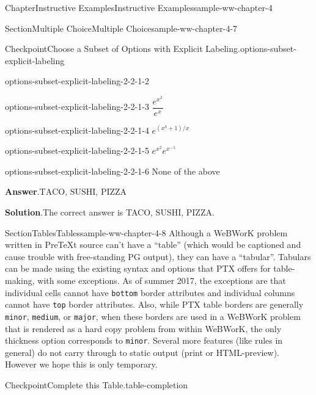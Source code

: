 \documentclass[oneside,10pt,]{book}
\newcommand{\blocktitlefont}{\relax}
\newcommand{\mono}[1]{\texttt{#1}}
\numberwithin{equation}{section}
\begin{document}
\begin{chapterptx}{Chapter}{Instructive Examples}{}{Instructive Examples}{}{}{sample-ww-chapter-4}
\begin{sectionptx}{Section}{Multiple Choice}{}{Multiple Choice}{}{}{sample-ww-chapter-4-7}
\begin{inlineexercise}{Checkpoint}{Choose a Subset of Options with Explicit Labeling.}{options-subset-explicit-labeling}
\begin{descriptionlist}
\begin{dlinarrow}{}{options-subset-explicit-labeling-2-2-1-2}
\end{dlinarrow}%
\begin{dlinarrow}{}{options-subset-explicit-labeling-2-2-1-3}%
\(\displaystyle \dfrac{ e^{x^2} }{ e^x }\)%
\end{dlinarrow}%
\begin{dlinarrow}{}{options-subset-explicit-labeling-2-2-1-4}%
\(\displaystyle e^{ (x^3+1) / x}\)%
\end{dlinarrow}%
\begin{dlinarrow}{}{options-subset-explicit-labeling-2-2-1-5}%
\(\displaystyle e^{x^2} e^{x^{-1}}\)%
\end{dlinarrow}%
\begin{dlinarrow}{}{options-subset-explicit-labeling-2-2-1-6}%
None of the above%
\end{dlinarrow}%
\end{descriptionlist}
%
\par\smallskip%
\noindent\textbf{\blocktitlefont Answer}.\hypertarget{options-subset-explicit-labeling-3}{}\quad{}\(\text{TACO, SUSHI, PIZZA}\)%
\par\smallskip%
\noindent\textbf{\blocktitlefont Solution}.\hypertarget{options-subset-explicit-labeling-4}{}\quad{}The correct answer is TACO, SUSHI, PIZZA.%
\end{inlineexercise}%
\end{sectionptx}
%
%
\typeout{************************************************}
\typeout{************************************************}
%
\begin{sectionptx}{Section}{Tables}{}{Tables}{}{}{sample-ww-chapter-4-8}
Although a WeBWorK problem written in PreTeXt source can't have a ``table'' (which would be captioned and cause trouble with free-standing PG output), they can have a ``tabular''. Tabulars can be made using the existing syntax and options that PTX offers for table-making, with some exceptions. As of summer 2017, the exceptions are that individual cells cannot have \mono{bottom} border attributes and individual columns cannot have \mono{top} border attributes. Also, while PTX table borders are generally \mono{minor}, \mono{medium}, or \mono{major}, when these borders are used in a WeBWorK problem that is rendered as a hard copy problem from within WeBWorK, the only thickness option corresponds to \mono{minor}. Several more features (like rules in general) do not carry through to static output (print or HTML-preview). However we hope this is only temporary.%
\begin{inlineexercise}{Checkpoint}{Complete this Table.}{table-completion}%

\end{inlineexercise}
\end{sectionptx}
\end{chapterptx}
\end{document}
